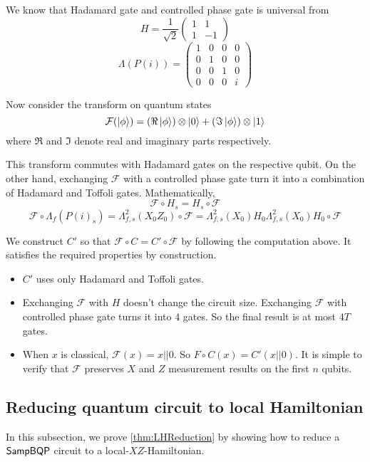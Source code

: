 \begin{prf}
	We know that Hadamard gate and controlled phase gate is universal from \cite{kitaev_1997}
	$$H=\frac{1}{\sqrt{2}}\begin{pmatrix}1&1\\1&-1\end{pmatrix}$$
		$$\Lambda(P(i))=\begin{pmatrix}1&0&0&0\\0&1&0&0\\0&0&1&0\\0&0&0&i\end{pmatrix}$$

	Now consider the transform on quantum states
	$$\mathcal{F}(\ket{\phi})=(\Re\ket{\phi})\otimes\ket{0}+(\Im\ket{\phi})\otimes\ket{1}$$
	where $\Re$ and $\Im$ denote real and imaginary parts respectively.

	This transform commutes with Hadamard gates on the respective qubit. On the other hand, exchanging $\mathcal{F}$ with a controlled phase gate turn it into a combination of Hadamard and Toffoli gates. Mathematically,
	$$\mathcal{F}\circ H_s=H_s\circ\mathcal{F}$$
	$$\mathcal{F}\circ\Lambda_f(P(i)_s)=\Lambda^2_{f,s}(X_0Z_0)\circ\mathcal{F}=\Lambda^2_{f,s}(X_0)H_0\Lambda^2_{f,s}(X_0)H_0\circ\mathcal{F}$$

	We construct $C'$ so that $\mathcal{F}\circ C=C'\circ\mathcal{F}$ by following the computation above. It satisfies the required properties by construction.
	\begin{itemize}
		\item $C'$ uses only Hadamard and Toffoli gates.
		\item Exchanging $\mathcal{F}$ with $H$ doesn't change the circuit size. Exchanging $\mathcal{F}$ with controlled phase gate turns it into $4$ gates. So the final result is at most $4T$ gates.
		\item When $x$ is classical, $\mathcal{F}(x)=x||0$. So $F\circ C(x)=C'(x||0)$. It is simple to verify that $\mathcal{F}$ preserves $X$ and $Z$ measurement results on the first $n$ qubits.
	\end{itemize}
\end{prf}

\subsection{Reducing quantum circuit to local Hamiltonian}

In this subsection, we prove \cref{thm:LHReduction} by showing how to reduce a $\operatorname{\mathsf{SampBQP}}$ circuit to a local-$XZ$-Hamiltonian.

